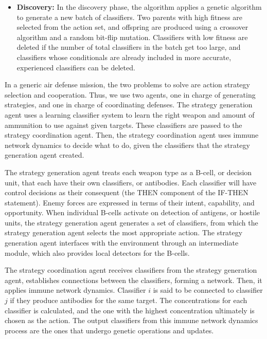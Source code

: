 \documentclass[12pt]{article} %
\begin{document}
\begin{itemize}
        \item \textbf{Discovery:} In the discovery phase, the algorithm applies a genetic algorithm to generate a new batch of classifiers. Two parents with high fitness are selected from the action set, and offspring are produced using a crossover algorithm and a random bit-flip mutation. Classifiers with low fitness are deleted if the number of total classifiers in the batch get too large, and classifiers whose conditionals are already included in more accurate, experienced classifiers can be deleted.
    \end{itemize} 
     
    In a generic air defense mission, the two problems to solve are action strategy selection and cooperation. Thus, we use two agents, one in charge of generating strategies, and one in charge of coordinating defenses. The strategy generation agent uses a learning classifier system to learn the right weapon and amount of ammunition to use against given targets. These classifiers are passed to the strategy coordination agent. Then, the strategy coordination agent uses immune network dynamics to decide what to do, given the classifiers that the strategy generation agent created. 

    The strategy generation agent treats each weapon type as a B-cell, or decision unit, that each have their own classifiers, or antibodies. Each classifier will have control decisions as their consequent (the THEN component of the IF-THEN statement). Enemy forces are expressed in terms of their intent, capability, and opportunity. When individual B-cells activate on detection of antigens, or hostile units, the strategy generation agent generates a set of classifiers, from which the strategy generation agent selects the most appropriate action. The strategy generation agent interfaces with the environment through an intermediate module, which also provides local detectors for the B-cells.

    The strategy coordination agent receives classifiers from the strategy generation agent, establishes connections between the classifiers, forming a network. Then, it applies immune network dynamics. Classifier $i$ is said to be connected to classifier $j$ if they produce antibodies for the same target. The concentrations for each classifier is calculated, and the one with the highest concentration ultimately is chosen as the action. The output classifiers from this immune network dynamics process are the ones that undergo genetic operations and updates. 
    
\end{document}
